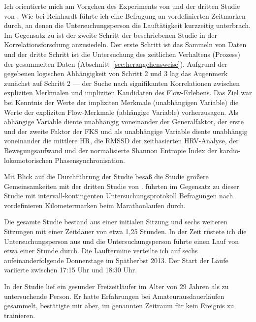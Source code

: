 Ich orientierte mich am Vorgehen des Experiments von \citet{Reinhardt2006} und der dritten Studie von \citet{Schuler2009}. Wie bei Reinhardt führte ich eine Befragung an vordefinierten Zeitmarken durch, an denen die Untersuchungsperson die Lauftätigkeit kurzzeitig unterbrach. Im Gegensatz zu \citet{Reinhardt2006} ist der zweite Schritt der beschriebenen Studie in der Korrelationsforschung anzusiedeln. Der erste Schritt ist das Sammeln von Daten und der dritte Schritt ist die Untersuchung des zeitlichen Verhaltens (Prozess) der gesammelten Daten (Abschnitt~\ref{sec:herangehensweise}). Aufgrund der gegebenen logischen Abhängigkeit von Schritt 2 und 3 lag das Augenmerk zunächst auf Schritt 2 --- der Suche nach signifikanten Korrelationen zwischen expliziten Merkmalen und impliziten Kandidaten des Flow-Erlebens. Das Ziel war bei Kenntnis der Werte der impliziten Merkmale (unabhängigen Variable) die Werte der expliziten Flow-Merkmale (abhängige Variable) vorherzusagen. Als abhängige Variable diente unabhängig voneinander der Generalfaktor, der erste und der zweite Faktor der \ac{FKS} und als unabhängige Variable diente unabhängig voneinander die mittlere \ac{HR}, die \acs{RMSSD} der zeitbasierten \ac{HRV}-Analyse, der Bewegungsaufwand und der normalisierte Shannon Entropie Index der kardio-lokomotorischen Phasensynchronisation.

Mit Blick auf die Durchführung der Studie besaß die Studie größere Gemeinsamkeiten mit der dritten Studie von \citet{Schuler2009}. \citet{Schuler2009} führten im Gegensatz zu dieser Studie mit intervall-kontingenten Untersuchungsprotokoll Befragungen nach vordefinieren Kilometermarken beim Marathonlaufen durch. 

Die gesamte Studie bestand aus einer initialen Sitzung und sechs weiteren Sitzungen mit einer Zeitdauer von etwa 1,25 Stunden. In der Zeit rüstete ich die Untersuchungsperson aus und die Untersuchungsperson führte einen Lauf von etwa einer Stunde durch. Die Lauftermine verteilte ich auf sechs aufeinanderfolgende Donnerstage im Spätherbst 2013. Der Start der Läufe variierte zwischen 17:15 Uhr und 18:30 Uhr.

In der Studie lief ein gesunder Freizeitläufer im Alter von 29 Jahren als zu untersuchende Person. Er hatte Erfahrungen bei Amateurausdauerläufen gesammelt, bestätigte mir aber, im genannten Zeitraum für kein Ereignis zu trainieren.

